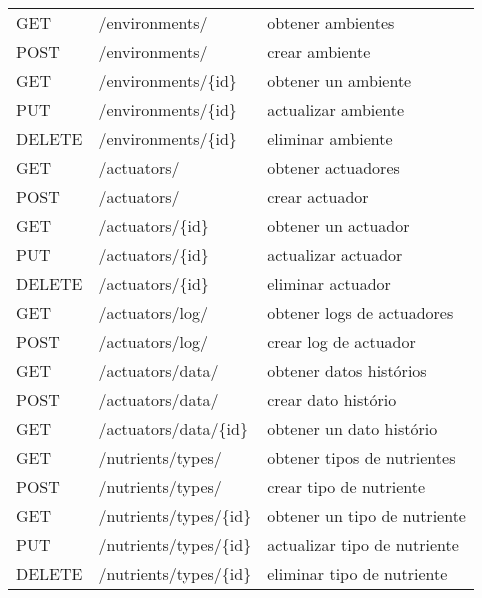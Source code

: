 \begin{table}[H]
\begin{tabular}{l l l}
        \midrule
        GET             & /environments/                 & obtener ambientes            \\
        POST            & /environments/                 & crear ambiente               \\
        GET             & /environments/\{id\}             & obtener un ambiente          \\
        PUT             & /environments/\{id\}             & actualizar ambiente          \\
        DELETE          & /environments/\{id\}             & eliminar ambiente            \\
        \midrule
        GET             & /actuators/                    & obtener actuadores           \\
        POST            & /actuators/                    & crear actuador               \\
        GET             & /actuators/\{id\}                & obtener un actuador          \\
        PUT             & /actuators/\{id\}                & actualizar actuador          \\
        DELETE          & /actuators/\{id\}                & eliminar actuador            \\
        \midrule
        GET             & /actuators/log/                & obtener logs de actuadores   \\
        POST            & /actuators/log/                & crear log de actuador        \\
        \midrule
        GET             & /actuators/data/               & obtener datos histórios      \\
        POST            & /actuators/data/               & crear dato histório          \\
        GET             & /actuators/data/\{id\}           & obtener un dato histório     \\
        \midrule
        GET             & /nutrients/types/              & obtener tipos de nutrientes  \\
        POST            & /nutrients/types/              & crear tipo de nutriente      \\
        GET             & /nutrients/types/\{id\}          & obtener un tipo de nutriente \\
        PUT             & /nutrients/types/\{id\}          & actualizar tipo de nutriente \\
        DELETE          & /nutrients/types/\{id\}          & eliminar tipo de nutriente   \\

\end{tabular}
\end{table}

